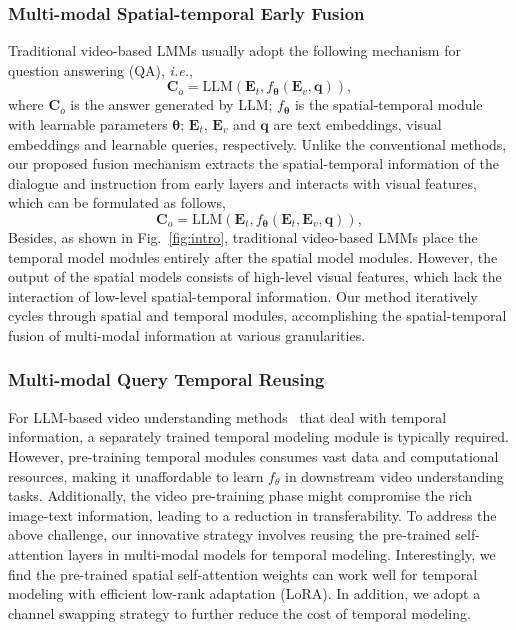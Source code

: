 \subsubsection{Multi-modal Spatial-temporal Early Fusion}
Traditional video-based LMMs usually adopt the following mechanism for question answering (QA), \textit{i.e.},
\begin{equation}
\label{eq:traditional fusion}
    \mathbf{C}_o = \text{LLM}(\mathbf{E}_t, f_{\mathbf{\theta}}(\mathbf{E}_v,\mathbf{q})),
\end{equation}
where $\mathbf{C}_o$ is the answer generated by LLM; $f_{\mathbf{\theta}}$ is the spatial-temporal module with learnable parameters $\mathbf{\theta}$; $\mathbf{E}_t$, $\mathbf{E}_v$ and $\mathbf{q}$ are text embeddings, visual embeddings and learnable queries, respectively. 
Unlike the conventional methods, our proposed fusion mechanism extracts the spatial-temporal information of the dialogue and instruction from early layers and interacts with visual features, which can be formulated as follows,
\begin{equation}
\label{eq:our fusion}
    \mathbf{C}_o = \text{LLM}(\mathbf{E}_t, f_{\mathbf{\theta}}(\mathbf{E}_t, \mathbf{E}_v, \mathbf{q})),
\end{equation}
Besides, as shown in Fig.~\ref{fig:intro}, traditional video-based LMMs place the temporal model modules entirely after the spatial model modules. However, the output of the spatial models consists of high-level visual features, which lack the interaction of low-level spatial-temporal information. Our method iteratively cycles through spatial and temporal modules, accomplishing the spatial-temporal fusion of multi-modal information at various granularities.

\subsubsection{Multi-modal Query Temporal Reusing}
For LLM-based video understanding methods~\cite{zhang2023video,maaz2023video} that deal with temporal information, a separately trained temporal modeling module is typically required. However, pre-training temporal modules consumes vast data and computational resources, making it unaffordable to learn $f_{\theta}$ in downstream video understanding tasks. Additionally, the video pre-training phase might compromise the rich image-text information, leading to a reduction in transferability. To address the above challenge, our innovative strategy involves reusing the pre-trained self-attention layers in multi-modal models for temporal modeling. Interestingly, we find the pre-trained spatial self-attention weights can work well for temporal modeling with efficient low-rank adaptation (LoRA). In addition, we adopt a channel swapping strategy to further reduce the cost of temporal modeling. 

